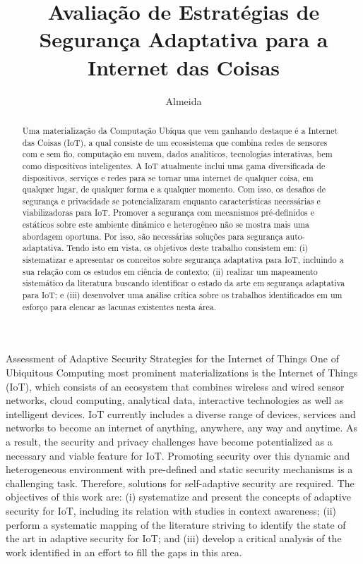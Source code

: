 \documentclass[tid,table]{texufpel} %
\title{Avaliação de Estratégias de Segurança Adaptativa para a Internet das Coisas}
\author{Almeida}{Ricardo Borges}
\begin{document}
\renewcommand{\coadvisorname}{Coorientadora}      %

\maketitle 

\sloppy



\begin{abstract}
Uma materialização da Computação Ubíqua que vem ganhando destaque é a Internet das Coisas (IoT), a qual consiste de um ecossistema que combina redes de sensores com e sem fio, computação em nuvem, dados analíticos, tecnologias interativas, bem como dispositivos inteligentes. A IoT atualmente inclui uma gama diversificada de dispositivos, serviços e redes para se tornar uma internet de qualquer coisa, em qualquer lugar, de qualquer forma e a qualquer momento. Com isso, os desafios de segurança e privacidade se potencializaram enquanto características necessárias e viabilizadoras para IoT. Promover a segurança com mecanismos pré-definidos e estáticos sobre este ambiente dinâmico e heterogêneo não se mostra mais uma abordagem oportuna. Por isso, são necessárias soluções para segurança auto-adaptativa. Tendo isto em vista, os objetivos deste trabalho consistem em: (i) sistematizar e apresentar os conceitos sobre segurança adaptativa para IoT, incluindo a sua relação com os estudos em ciência de contexto; (ii) realizar um mapeamento sistemático da literatura buscando identificar o estado da arte em segurança adaptativa para IoT; e (iii) desenvolver uma análise crítica sobre os trabalhos identificados em um esforço para elencar as lacunas existentes nesta área.
\end{abstract}


\begin{englishabstract}%
  {Assessment of Adaptive Security Strategies for the Internet of Things}
One of Ubiquitous Computing most prominent materializations is the Internet of Things (IoT), which consists of an ecosystem that combines wireless and wired sensor networks, cloud computing, analytical data, interactive technologies as well as intelligent devices. IoT currently includes a diverse range of devices, services and networks to become an internet of anything, anywhere, any way and anytime. As a result, the security and privacy challenges have become potentialized as a necessary and viable feature for IoT. Promoting security over this dynamic and heterogeneous environment with pre-defined and static security mechanisms is a challenging task. Therefore, solutions for self-adaptive security are required. The objectives of this work are: (i) systematize and present the concepts of adaptive security for IoT, including its relation with studies in context awareness; (ii) perform a systematic mapping of the literature striving to identify the state of the art in adaptive security for IoT; and (iii) develop a critical analysis of the work identified in an effort to fill the gaps in this area.
\end{englishabstract}
\end{document}
